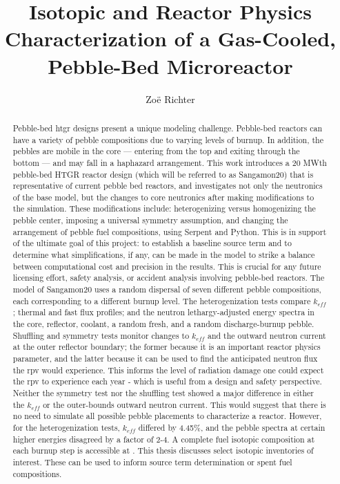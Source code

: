 \documentclass[edeposit,fullpage]{uiucthesis2018}
\title{Isotopic and Reactor Physics Characterization of a Gas-Cooled, Pebble-Bed Microreactor}
\author{Zo{\"e} Richter}
\begin{document}
\maketitle

\frontmatter
\begin{abstract}
Pebble-bed \acrfull{htgr} designs present a unique modeling challenge.  Pebble-bed reactors can have a variety of pebble compositions due to varying levels of burnup.  In addition, the pebbles are mobile in the core --- entering from the top and exiting through the bottom --- and may fall in a haphazard arrangement.  This work introduces a 20 MWth pebble-bed HTGR reactor design (which will be referred to as Sangamon20) that is representative of current pebble bed reactors, and investigates not only the neutronics of the base model, but the changes to core neutronics after making modifications to the simulation.  These modifications include: heterogenizing versus homogenizing the pebble center, imposing a universal symmetry assumption, and changing the arrangement of pebble fuel compositions, using Serpent and Python.  This is in support of the ultimate goal of this project: to establish a baseline source term and to determine what simplifications, if any, can be made in the model to strike a balance between computational cost and precision in the results.  This is crucial for any future licensing effort, safety analysis, or accident analysis involving pebble-bed reactors.  The model of Sangamon20 uses a random dispersal of seven different pebble compositions, each corresponding to a different burnup level.  The heterogenization tests compare $k_{eff}$; thermal and fast flux profiles; and the neutron lethargy-adjusted energy spectra in the core, reflector, coolant, a random fresh, and a random discharge-burnup pebble.  Shuffling and symmetry tests monitor changes to $k_{eff}$ and the outward neutron current at the outer reflector boundary; the former because it is an important reactor physics parameter, and the latter because it can be used to find the anticipated neutron flux the \acrfull{rpv} would experience.  This informs the level of radiation damage one could expect the \acrshort{rpv} to experience each year - which is useful from a design and safety perspective.  Neither the symmetry test nor the shuffling test showed a major difference in either the $k_{eff}$ or the outer-bounds outward neutron current.  This would suggest that there is no need to simulate all possible pebble placements to characterize a reactor.  However, for the heterogenization tests, $k_{eff}$ differed by 4.45\%, and the pebble spectra at certain higher energies disagreed by a factor of 2-4.  A complete fuel isotopic composition at each burnup step is accessible at \cite{richter_isotopic_2021}. This thesis discusses select isotopic inventories of interest.  These can be used to inform source term determination or spent fuel compositions.

\end{abstract}
\end{document}

